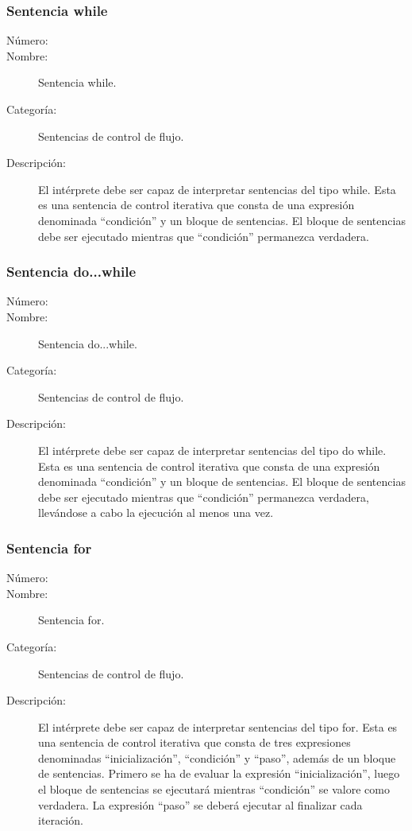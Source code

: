 \subsubsection{Sentencia while}
	\begin{description}
		\item [Número:] \cn
		\item [Nombre:] Sentencia while.
		\item [Categoría:] Sentencias de control de flujo.
		\item [Descripción:] El intérprete debe ser capaz de interpretar sentencias del tipo while. Esta es una sentencia de control
		iterativa que consta de una expresión denominada ``condición'' y un bloque de sentencias. El bloque de sentencias debe ser ejecutado
	    mientras que ``condición'' permanezca verdadera.
	\end {description}

\subsubsection{Sentencia do...while}
	\begin{description}
		\item [Número:] \cn
		\item [Nombre:] Sentencia do...while.
		\item [Categoría:] Sentencias de control de flujo.
		\item [Descripción:] El intérprete debe ser capaz de interpretar sentencias del tipo do while. Esta es una sentencia de control
		iterativa que consta de una expresión denominada ``condición'' y un bloque de sentencias. El bloque de sentencias debe ser ejecutado
	    mientras que ``condición'' permanezca verdadera, llevándose a cabo la ejecución al menos una vez.
	\end {description}

\subsubsection{Sentencia for}
	\begin{description}
		\item [Número:] \cn
		\item [Nombre:] Sentencia for.
		\item [Categoría:] Sentencias de control de flujo.
		\item [Descripción:] El intérprete debe ser capaz de interpretar sentencias del tipo for. Esta es una sentencia de control
		iterativa que consta de tres expresiones denominadas ``inicialización'', ``condición'' y ``paso'', además de un bloque de sentencias.
		Primero se ha de evaluar la expresión ``inicialización'', luego el bloque de sentencias se ejecutará mientras ``condición'' se
		valore como verdadera. La expresión ``paso'' se deberá ejecutar al finalizar cada iteración.  
	\end {description}


